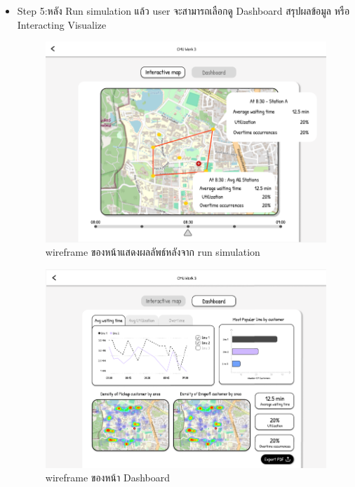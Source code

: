\begin{mypara}
\begin{itemize}
    \item Step 5:หลัง Run simulation แล้ว user จะสามารถเลือกดู  Dashboard สรุปผลข้อมูล 
    หรือ Interacting Visualize
      \begin{figure}[H]
        \centering
        \includegraphics[scale=0.4]{output_show.png}
        \caption{wireframe ของหน้าแสดงผลลัพธ์หลังจาก run simulation}
        \label{fig:WireframeOutputGuest}
      \end{figure} 

      \begin{figure}[H]
        \centering
        \includegraphics[scale=0.4]{dashboard.png}
        \caption{wireframe ของหน้า Dashboard }
        \label{fig:WireframeDashboardGuest}
      \end{figure}
    

\end{itemize}
\end{mypara}
